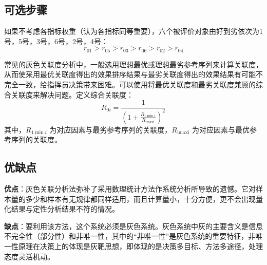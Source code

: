 \subsection{可选步骤}

\begin{definition}[关联度排序]
    如果不考虑各指标权重（认为各指标同等重要），六个被评价对象由好到劣依次为1号，5号，3号，6号，2号，4号：
    $$
        r_{01}>r_{05}>r_{03}>r_{06}>r_{02}>r_{04}
    $$
\end{definition}

\begin{definition}[综合关联度计算]
    常见的灰色关联度分析中，一般选用理想最优或理想最劣参考序列来计算关联度，从而使采用最优关联度得出的效果排序结果与最劣关联度得出的效果结果有可能不完全一致，给指挥员决策带来困难。可以使用将最优关联度和最劣关联度兼顾的综合关联度来解决问题。定义综合关联度：
    $$
R_{0 i}=\frac{1}{\left(1+\frac{R_{1 \min i}}{R_{\operatorname{lmaxi}}}\right)^2}
$$
其中，$R_{1 \min i}$ 为对应因素与最劣参考序列的关联度，$R_{\operatorname{lmaxi}}$ 为对应因素与最优参考序列的关联度。
\end{definition}

\subsection{优缺点}

\textbf{优点}：灰色关联分析法弥补了采用数理统计方法作系统分析所导致的遗憾。它对样本量的多少和样本有无规律都同样适用，而且计算量小，十分方便，更不会出现量化结果与定性分析结果不符的情况。

\textbf{缺点}：要利用该方法，这个系统必须是灰色系统。灰色系统中灰的主要含义是信息不完全性（部分性）和非唯一性，其中的“非唯一性”是灰色系统的重要特征，非唯一性原理在决策上的体现是灰靶思想，即体现的是决策多目标、方法多途径，处理态度灵活机动。
